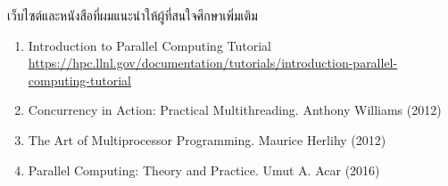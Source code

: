 เว็บไซต์และหนังสือที่ผมแนะนำให้ผู้ที่สนใจศึกษาเพิ่มเติม
%
\begin{enumerate}[topsep=0pt,noitemsep]
  \setlength\itemsep{0.5em}
  \item Introduction to Parallel Computing Tutorial \url{https://hpc.llnl.gov/documentation/tutorials/introduction-parallel-computing-tutorial}

  \item \cpp Concurrency in Action: Practical Multithreading. Anthony Williams (2012)

  \item The Art of Multiprocessor Programming. Maurice Herlihy (2012)

  \item Parallel Computing: Theory and Practice. Umut A. Acar (2016)
\end{enumerate}

